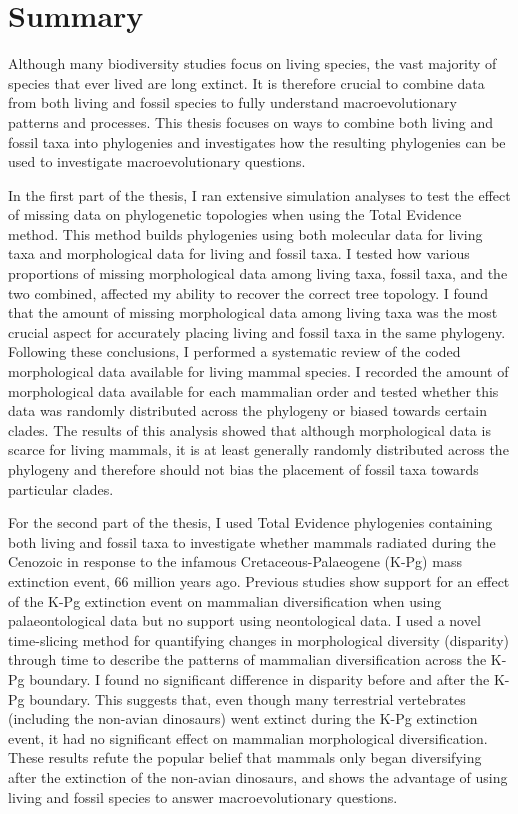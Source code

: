 \chapter*{Summary}
Although many biodiversity studies focus on living species, the vast majority of species that ever lived are long extinct.
It is therefore crucial to combine data from both living and fossil species to fully understand macroevolutionary patterns and processes.
This thesis focuses on ways to combine both living and fossil taxa into phylogenies and investigates how the resulting phylogenies can be used to investigate macroevolutionary questions.

In the first part of the thesis, I ran extensive simulation analyses to test the effect of missing data on phylogenetic topologies when using the Total Evidence method.
This method builds phylogenies using both molecular data for living taxa and morphological data for living and fossil taxa.
I tested how various proportions of missing morphological data among living taxa, fossil taxa, and the two combined, affected my ability to recover the correct tree topology.
I found that the amount of missing morphological data among living taxa was the most crucial aspect for accurately placing living and fossil taxa in the same phylogeny.
Following these conclusions, I performed a systematic review of the coded morphological data available for living mammal species.
I recorded the amount of morphological data available for each mammalian order and tested whether this data was randomly distributed across the phylogeny or biased towards certain clades.
The results of this analysis showed that although morphological data is scarce for living mammals, it is at least generally randomly distributed across the phylogeny and therefore should not bias the placement of fossil taxa towards particular clades.

For the second part of the thesis, I used Total Evidence phylogenies containing both living and fossil taxa to investigate whether mammals radiated during the Cenozoic in response to the infamous Cretaceous-Palaeogene (K-Pg) mass extinction event, 66 million years ago.
Previous studies show support for an effect of the K-Pg extinction event on mammalian diversification when using palaeontological data but no support using neontological data.
I used a novel time-slicing method for quantifying changes in morphological diversity (disparity) through time to describe the patterns of mammalian diversification across the K-Pg boundary.
I found no significant difference in disparity before and after the K-Pg boundary.
This suggests that, even though many terrestrial vertebrates (including the non-avian dinosaurs) went extinct during the K-Pg extinction event, it had no significant effect on mammalian morphological diversification.
These results refute the popular belief that mammals only began diversifying after the extinction of the non-avian dinosaurs, and shows the advantage of using living and fossil species to answer macroevolutionary questions.

